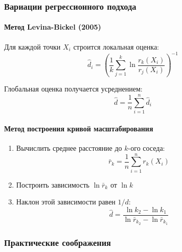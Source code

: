 \documentclass[a4paper,12pt]{article}
\begin{document}
\subsubsection{Вариации регрессионного подхода}

\paragraph{Метод Levina-Bickel (2005)}

Для каждой точки $X_i$ строится локальная оценка:
\begin{equation}
    \hat{d}_i = \left( \frac{1}{k} \sum_{j=1}^k \ln \frac{r_k(X_i)}{r_j(X_i)} \right)^{-1}
\end{equation}

Глобальная оценка получается усреднением:
\begin{equation}
    \hat{d} = \frac{1}{n} \sum_{i=1}^n \hat{d}_i
\end{equation}

\paragraph{Метод построения кривой масштабирования}

\begin{enumerate}
    \item Вычислить среднее расстояние до $k$-ого соседа:
    \begin{equation}
        \bar{r}_k = \frac{1}{n} \sum_{i=1}^n r_k(X_i)
    \end{equation}

    \item Построить зависимость $\ln \bar{r}_k$ от $\ln k$
    \item Наклон этой зависимости равен $1/d$:
    \begin{equation}
        \hat{d} = \frac{\ln k_2 - \ln k_1}{\ln \bar{r}_{k_2} - \ln \bar{r}_{k_1}}
    \end{equation}
\end{enumerate}

\subsubsection{Практические соображения}
\end{document}
